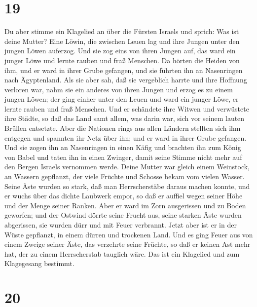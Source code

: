 \hypertarget{section-18}{%
\section{19}\label{section-18}}

 Du aber stimme ein Klagelied an über die Fürsten Israels
und sprich:  Was ist deine Mutter? Eine Löwin, die
zwischen Leuen lag und ihre Jungen unter den jungen Löwen auferzog.
 Und sie zog eins von ihren Jungen auf, das ward ein
junger Löwe und lernte rauben und fraß Menschen.  Da
hörten die Heiden von ihm, und er ward in ihrer Grube gefangen, und sie
führten ihn an Nasenringen nach Ägyptenland.  Als sie aber
sah, daß sie vergeblich harrte und ihre Hoffnung verloren war, nahm sie
ein anderes von ihren Jungen und erzog es zu einem jungen Löwen;
 der ging einher unter den Leuen und ward ein junger Löwe,
er lernte rauben und fraß Menschen.  Und er schändete ihre
Witwen und verwüstete ihre Städte, so daß das Land samt allem, was darin
war, sich vor seinem lauten Brüllen entsetzte.  Aber die
Nationen rings aus allen Ländern stellten sich ihm entgegen und spannten
ihr Netz über ihn; und er ward in ihrer Grube gefangen. 
Und sie zogen ihn an Nasenringen in einen Käfig und brachten ihn zum
König von Babel und taten ihn in einen Zwinger, damit seine Stimme nicht
mehr auf den Bergen Israels vernommen werde.  Deine
Mutter war gleich einem Weinstock, an Wassern gepflanzt, der viele
Früchte und Schosse bekam vom vielen Wasser.  Seine Äste
wurden so stark, daß man Herrscherstäbe daraus machen konnte, und er
wuchs über das dichte Laubwerk empor, so daß er auffiel wegen seiner
Höhe und der Menge seiner Ranken.  Aber er ward im Zorn
ausgerissen und zu Boden geworfen; und der Ostwind dörrte seine Frucht
aus, seine starken Äste wurden abgerissen, sie wurden dürr und mit Feuer
verbrannt.  Jetzt aber ist er in der Wüste gepflanzt, in
einem dürren und trockenen Land.  Und es ging Feuer aus
von einem Zweige seiner Äste, das verzehrte seine Früchte, so daß er
keinen Ast mehr hat, der zu einem Herrscherstab tauglich wäre. Das ist
ein Klagelied und zum Klagegesang bestimmt.

\hypertarget{section-19}{%
\section{20}\label{section-19}}

